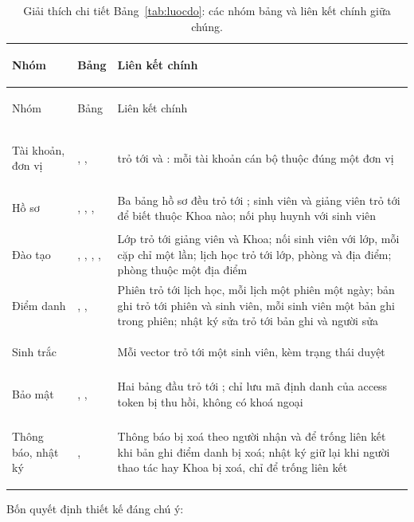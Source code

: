 {\small
\begin{xltabular}{\textwidth}{@{}>{\bfseries\raggedright\arraybackslash\leavevmode}p{2.4cm} >{\raggedright\arraybackslash\leavevmode}p{4.4cm} >{\raggedright\arraybackslash\leavevmode}X@{}}
\caption{Giải thích chi tiết Bảng~\ref{tab:luocdo}: các nhóm bảng và liên kết chính giữa chúng.}
\label{tab:luocdo-gt}\\
\toprule
Nhóm & Bảng & Liên kết chính \\
\midrule
\endfirsthead
\toprule
Nhóm & Bảng & Liên kết chính \\
\midrule
\endhead
\bottomrule
\endfoot
Tài khoản, đơn vị & , ,  &  trỏ tới  và : mỗi tài khoản cán bộ thuộc đúng một đơn vị \\
Hồ sơ & , , ,  & Ba bảng hồ sơ đều trỏ tới ; sinh viên và giảng viên trỏ tới  để biết thuộc Khoa nào;  nối phụ huynh với sinh viên \\
Đào tạo & , , , ,  & Lớp trỏ tới giảng viên và Khoa;  nối sinh viên với lớp, mỗi cặp chỉ một lần; lịch học trỏ tới lớp, phòng và địa điểm; phòng thuộc một địa điểm \\
Điểm danh & , ,  & Phiên trỏ tới lịch học, mỗi lịch một phiên một ngày; bản ghi trỏ tới phiên và sinh viên, mỗi sinh viên một bản ghi trong phiên; nhật ký sửa trỏ tới bản ghi và người sửa \\
Sinh trắc &  & Mỗi vector trỏ tới một sinh viên, kèm trạng thái duyệt \\
Bảo mật & , ,  & Hai bảng đầu trỏ tới ;  chỉ lưu mã định danh của access token bị thu hồi, không có khoá ngoại \\
Thông báo, nhật ký & ,  & Thông báo bị xoá theo người nhận và để trống liên kết khi bản ghi điểm danh bị xoá; nhật ký giữ lại khi người thao tác hay Khoa bị xoá, chỉ để trống liên kết \\
\end{xltabular}}

Bốn quyết định thiết kế đáng chú ý:

